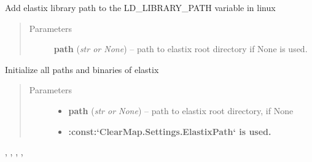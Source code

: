 \documentclass[letterpaper,10pt,english]{sphinxmanual}
\begin{document}

\begin{fulllineitems}
\label{api/ClearMap.Alignment:ClearMap.Alignment.Elastix.setElastixLibraryPath}
Add elastix library path to the LD\_LIBRARY\_PATH variable in linux
\begin{quote}\begin{description}
\item[{Parameters}] \leavevmode
\textbf{path} (\emph{str or None}) --
path to elastix root directory if None {\hyperref[api/ClearMap.Settings:ClearMap.Settings.ElastixPath]{\emph{}}} is used.

\end{description}\end{quote}

\end{fulllineitems}


\begin{fulllineitems}
\label{api/ClearMap.Alignment:ClearMap.Alignment.Elastix.initializeElastix}
Initialize all paths and binaries of elastix
\begin{quote}\begin{description}
\item[{Parameters}] \leavevmode\begin{itemize}
\item {} 
\textbf{path} (\emph{str or None}) --
path to elastix root directory, if None

\item {} 
\textbf{:const:{}`ClearMap.Settings.ElastixPath{}` is used.}

\end{itemize}

\end{description}\end{quote}




{\hyperref[api/ClearMap.Alignment:ClearMap.Alignment.Elastix.ElastixBinary]{\emph{}}}, {\hyperref[api/ClearMap.Alignment:ClearMap.Alignment.Elastix.ElastixLib]{\emph{}}}, {\hyperref[api/ClearMap.Alignment:ClearMap.Alignment.Elastix.TransformixBinary]{\emph{}}},
{\hyperref[api/ClearMap.Alignment:ClearMap.Alignment.Elastix.Initialized]{\emph{}}}, {\hyperref[api/ClearMap.Alignment:ClearMap.Alignment.Elastix.setElastixLibraryPath]{\emph{}}}



\end{fulllineitems}
\end{document}
